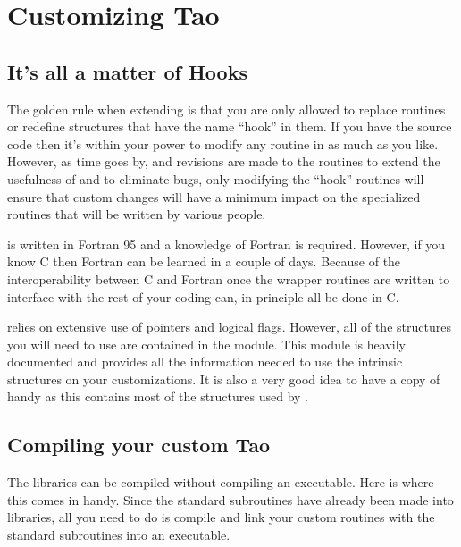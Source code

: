 \chapter{Customizing Tao}
\label{c:custom-tao}

\section{It's all a matter of Hooks}

The golden rule when extending \tao is that you are only allowed to
replace routines or redefine structures that have the name ``hook'' in
them.  If you have the source code then it's within your power to
modify any routine in \tao as much as you like. However, as time goes
by, and revisions are made to the \tao routines to extend the
usefulness of \tao and to eliminate bugs, only modifying the ``hook''
routines will ensure that custom changes will have a minimum impact on
the specialized routines that will be written by various people.

\tao is written in Fortran 95 and a knowledge of Fortran is
required. However, if you know C then Fortran can be learned in a
couple of days. Because of the interoperability between C and Fortran
once the wrapper routines are written to interface with \tao the rest
of your coding can, in principle all be done in C.

\tao relies on extensive use of pointers and logical flags. However,
all of the structures you will need to use are contained in the
 module. This module is heavily documented and
provides all the information needed to use the intrinsic \tao
structures on your customizations. It is also a very good idea to have
a copy of  handy as this contains most of the
structures used by \bmad.

\section{Compiling your custom Tao}

The \tao libraries can be compiled without compiling an
executable. Here is where this comes in handy. Since the standard \tao
subroutines have already been made into libraries, all you need to do
is compile and link your custom routines with the standard \tao
subroutines into an executable.

